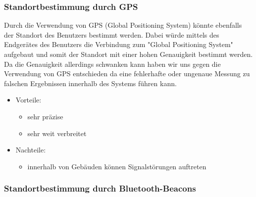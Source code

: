 \subsubsection{Standortbestimmung durch GPS}
\label{sec:Standortbestimmung durch GPS}

Durch die Verwendung von GPS (Global Positioning System) könnte ebenfalls der
Standort des Benutzers bestimmt werden. Dabei würde mittels des Endgerätes des
Benutzers die Verbindung
zum "Global Positioning System" aufgebaut und somit der Standort mit einer hohen
Genauigkeit bestimmt werden. Da die Genauigkeit allerdings schwanken kann haben
wir uns gegen die Verwendung von GPS entschieden da eine fehlerhafte oder
ungenaue Messung zu falschen Ergebnissen innerhalb des Systems führen kann.

\begin{itemize}
	\item Vorteile:
	\begin{itemize}
		\item sehr präzise
		\item sehr weit verbreitet
	\end{itemize}
	\item Nachteile:
	\begin{itemize}
		\item innerhalb von Gebäuden können Signalstörungen auftreten
	\end{itemize}
\end{itemize}

\subsubsection{Standortbestimmung durch Bluetooth-Beacons}
\label{sec:Standortbestimmung durch Bluetooth-Beacons}

